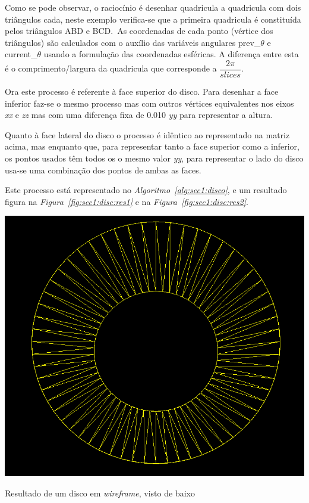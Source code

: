 Como se pode observar, o raciocínio é desenhar quadricula a quadricula com dois
triângulos cada, neste exemplo verifica-se que a primeira quadricula
é constituída pelos triângulos ABD e BCD.\ As coordenadas de cada ponto (vértice
dos triângulos) são calculados com o auxílio das variáveis angulares
prev\_$\theta $ e current\_$\theta$ usando a formulação das coordenadas
esféricas. A diferença entre esta é o comprimento/largura da quadricula que
corresponde a $\dfrac{2\pi}{slices}$. 

Ora este processo é referente à face superior do disco. Para desenhar a face
inferior faz-se o mesmo processo mas com outros vértices equivalentes nos eixos
\emph{xx} e \emph{zz} mas com uma diferença fixa de 0.010 \emph{yy} para
representar a altura.

Quanto à face lateral do disco o processo é idêntico ao representado na matriz
acima, mas enquanto que, para representar tanto a face superior como a inferior,
os pontos usados têm todos os o mesmo valor \emph{yy}, para representar o lado do disco
usa-se uma combinação dos pontos de ambas as faces. 

Este processo está representado no \emph{Algoritmo~\ref{alg:sec1:disco}},
e um resultado figura na \emph{Figura~\ref{fig:sec1:disc:res1}} e na
\emph{Figura~\ref{fig:sec1:disc:res2}}.  

\begin{center}
 	\includegraphics[width=\textwidth,height=0.5\textheight,keepaspectratio]{resources/disco1.png}
 	\captionsetup{type=figure, width=0.8\linewidth}
	\caption{Resultado de um disco em \emph{wireframe}, visto de baixo}
\label{fig:sec1:disc:res1} 
\end{center}


